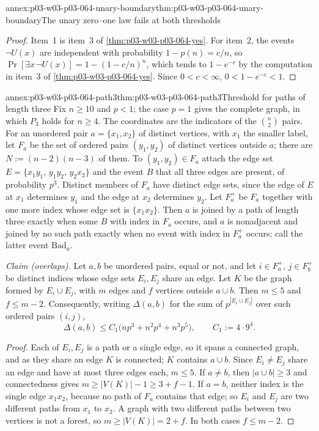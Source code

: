 \begin{annexitem}{annex:p03-w03-p03-064-unary-boundary}{thm:p03-w03-p03-064-unary-boundary}{The unary zero--one law fails at both thresholds}
\begin{proof}
Item~1 is item~3 of \cref{thm:p03-w03-p03-064-yes}.  For item~2, the events
\(\neg U(x)\) are independent with probability \(1-p(n)=c/n\), so
\(\Pr[\exists x\,\neg U(x)]=1-(1-c/n)^n\), which tends to \(1-e^{-c}\) by the
computation in item~3 of \cref{thm:p03-w03-p03-064-yes}.  Since
\(0<c<\infty\), \(0<1-e^{-c}<1\).
\end{proof}
\end{annexitem}

\begin{annexitem}{annex:p03-w03-p03-064-path3}{thm:p03-w03-p03-064-path3}{Threshold for paths of length three}
Fix \(n\geq10\) and \(p<1\); the case \(p=1\) gives the complete graph, in
which \(P_3\) holds for \(n\geq4\).  The coordinates are the indicators of
the \(\binom n2\) pairs.  For an unordered pair \(a=\{x_1,x_2\}\) of distinct
vertices, with \(x_1\) the smaller label, let \(F_a\) be the set of ordered
pairs \((y_1,y_2)\) of distinct vertices outside \(a\); there are
\(N:=(n-2)(n-3)\) of them.  To \((y_1,y_2)\in F_a\) attach the edge set
\(E=\{x_1y_1,\,y_1y_2,\,y_2x_2\}\) and the event \(B\) that all three edges
are present, of probability \(p^3\).  Distinct members of \(F_a\) have
distinct edge sets, since the edge of \(E\) at \(x_1\) determines \(y_1\) and
the edge at \(x_2\) determines \(y_2\).  Let \(F_a^+\) be \(F_a\) together with
one more index whose edge set is \(\{x_1x_2\}\).  Then \(a\) is joined by a
path of length three exactly when some \(B\) with index in \(F_a\) occurs,
and \(a\) is nonadjacent and joined by no such path exactly when no event
with index in \(F_a^+\) occurs; call the latter event \(\mathrm{Bad}_a\).

\emph{Claim (overlaps).}  Let \(a,b\) be unordered pairs, equal or not, and
let \(i\in F_a^+\), \(j\in F_b^+\) be distinct indices whose edge sets
\(E_i,E_j\) share an edge.  Let \(K\) be the graph formed by
\(E_i\cup E_j\), with \(m\) edges and \(f\) vertices outside \(a\cup b\).
Then \(m\leq5\) and \(f\leq m-2\).  Consequently, writing
\(\Delta(a,b)\) for the sum of \(p^{|E_i\cup E_j|}\) over such ordered pairs
\((i,j)\),
\[
  \Delta(a,b)\leq C_1\bigl(np^3+n^2p^4+n^3p^5\bigr),\qquad C_1:=4\cdot9^4.
\]
\begin{proof}
Each of \(E_i,E_j\) is a path or a single edge, so it spans a connected
graph, and as they share an edge \(K\) is connected; \(K\) contains
\(a\cup b\).  Since \(E_i\neq E_j\) share an edge and have at most three edges
each, \(m\leq5\).  If \(a\neq b\), then \(|a\cup b|\geq3\) and connectedness
gives \(m\geq|V(K)|-1\geq3+f-1\).  If \(a=b\), neither index is the single
edge \(x_1x_2\), because no path of \(F_a\) contains that edge; so \(E_i\) and
\(E_j\) are two different paths from \(x_1\) to \(x_2\).  A graph with two
different paths between two vertices is not a forest, so \(m\geq|V(K)|=2+f\).
In both cases \(f\leq m-2\).


\end{proof}
\end{annexitem}
